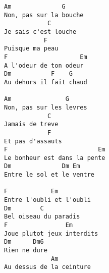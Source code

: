 \documentclass[10pt]{article}
\begin{document}
\begin{multicols}{4}
\columnbreak
\begin{verbatim}
Am              G
Non, pas sur la bouche
            C
Je sais c'est louche
           F
Puisque ma peau
F                    Em
A l'odeur de ton odeur
Dm           F    G
Au dehors il fait chaud

Am               G
Non, pas sur les levres
            C
Jamais de treve
            F
Et pas d'assauts
F                         Em
Le bonheur est dans la pente
Dm              Dm Em
Entre le sol et le ventre

F            Em
Entre l'oubli et l'oubli
Dm        C
Bel oiseau du paradis
F                Em
Joue plutot jeux interdits
Dm      Dm6
Rien ne dure
             Am
Au dessus de la ceinture
\end{verbatim}

\end{multicols}
\end{document}

